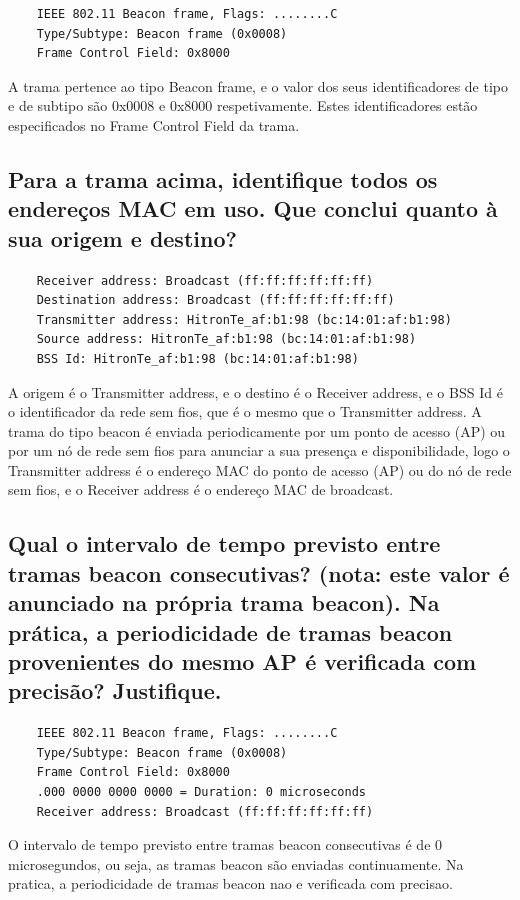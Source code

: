 \begin{verbatim}
    IEEE 802.11 Beacon frame, Flags: ........C
    Type/Subtype: Beacon frame (0x0008)
    Frame Control Field: 0x8000
\end{verbatim}
A trama pertence ao tipo Beacon frame, e o valor dos seus identificadores de tipo e de subtipo são 0x0008 e 0x8000 respetivamente. Estes identificadores estão especificados no Frame Control Field da trama.

\subsection{Para a trama acima, identifique todos os endereços MAC em uso. Que conclui  quanto à sua origem e destino?}

\begin{verbatim}
    Receiver address: Broadcast (ff:ff:ff:ff:ff:ff)
    Destination address: Broadcast (ff:ff:ff:ff:ff:ff)
    Transmitter address: HitronTe_af:b1:98 (bc:14:01:af:b1:98)
    Source address: HitronTe_af:b1:98 (bc:14:01:af:b1:98)
    BSS Id: HitronTe_af:b1:98 (bc:14:01:af:b1:98)
\end{verbatim}

A origem é o Transmitter address, e o destino é o Receiver address, e o BSS Id é o identificador da rede sem fios, que é o mesmo que o Transmitter address.
A trama do tipo beacon é enviada periodicamente por um ponto de acesso (AP) ou por um nó de rede sem fios para anunciar a sua presença e disponibilidade, logo o Transmitter address é o endereço MAC do ponto de acesso (AP) ou do nó de rede sem fios, e o Receiver address é o endereço MAC de broadcast.

\subsection{Qual o intervalo de tempo previsto entre tramas beacon consecutivas?  (nota:  este valor é anunciado na própria trama beacon). Na prática, a periodicidade de  tramas beacon provenientes do mesmo AP é verificada com precisão? Justifique.}

\begin{verbatim}
    IEEE 802.11 Beacon frame, Flags: ........C
    Type/Subtype: Beacon frame (0x0008)
    Frame Control Field: 0x8000
    .000 0000 0000 0000 = Duration: 0 microseconds
    Receiver address: Broadcast (ff:ff:ff:ff:ff:ff)
\end{verbatim}

O intervalo de tempo previsto entre tramas beacon consecutivas é de 0 microsegundos, ou seja, as tramas beacon são enviadas continuamente.
Na pratica, a periodicidade de tramas beacon nao e verificada com precisao.

